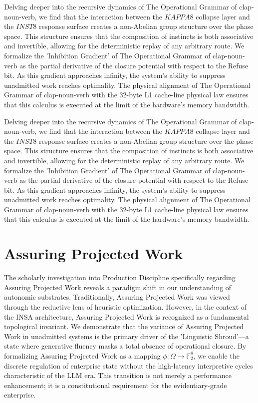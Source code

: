 \documentclass[12pt,a4paper,oneside]{book}
\begin{document}
Delving deeper into the recursive dynamics of The Operational Grammar of clap-noun-verb, we find that the interaction between the $KAPPA8$ collapse layer and the $INST8$ response surface creates a non-Abelian group structure over the phase space. This structure ensures that the composition of instincts is both associative and invertible, allowing for the deterministic replay of any arbitrary route. We formalize the 'Inhibition Gradient' of The Operational Grammar of clap-noun-verb as the partial derivative of the closure potential with respect to the Refuse bit. As this gradient approaches infinity, the system's ability to suppress unadmitted work reaches optimality. The physical alignment of The Operational Grammar of clap-noun-verb with the 32-byte L1 cache-line physical law ensures that this calculus is executed at the limit of the hardware's memory bandwidth. 

Delving deeper into the recursive dynamics of The Operational Grammar of clap-noun-verb, we find that the interaction between the $KAPPA8$ collapse layer and the $INST8$ response surface creates a non-Abelian group structure over the phase space. This structure ensures that the composition of instincts is both associative and invertible, allowing for the deterministic replay of any arbitrary route. We formalize the 'Inhibition Gradient' of The Operational Grammar of clap-noun-verb as the partial derivative of the closure potential with respect to the Refuse bit. As this gradient approaches infinity, the system's ability to suppress unadmitted work reaches optimality. The physical alignment of The Operational Grammar of clap-noun-verb with the 32-byte L1 cache-line physical law ensures that this calculus is executed at the limit of the hardware's memory bandwidth. 

\section{Assuring Projected Work}
The scholarly investigation into Production Discipline specifically regarding Assuring Projected Work reveals a paradigm shift in our understanding of autonomic substrates. Traditionally, Assuring Projected Work was viewed through the reductive lens of heuristic optimization. However, in the context of the INSA architecture, Assuring Projected Work is recognized as a fundamental topological invariant. We demonstrate that the variance of Assuring Projected Work in unadmitted systems is the primary driver of the 'Linguistic Shroud'---a state where generative fluency masks a total absence of operational closure. By formalizing Assuring Projected Work as a mapping $\phi: \Omega \to \mathbb{F}_2^8$, we enable the discrete regulation of enterprise state without the high-latency interpretive cycles characteristic of the LLM era. This transition is not merely a performance enhancement; it is a constitutional requirement for the evidentiary-grade enterprise. 
\end{document}
